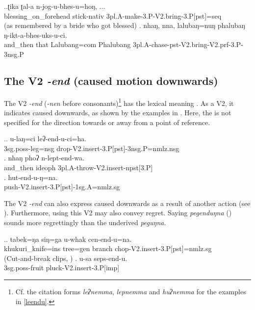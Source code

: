 \ex.\ag.ʈika ʈal-a n-jog-u-bhes-u=hoŋ, ...\\
blessing\_on\_forehead stick{\sc -nativ} {\sc 3pl.A-}make{\sc -3.P-V2.bring-3.P[pst]=seq}\\
 (as remembered by a bride who got blessed) 
\bg. nhaŋ,    nna,  lalubaŋ=nuŋ phalubaŋ ŋ-ikt-a-bhes-uks-u-ci.\\
and\_then that Lalubang{\sc =com}  Phalubang {\sc 3pl.A-}chase{\sc -pst-V2.bring-V2.prf-3.P-3nsg.P}\\
  


\subsection{The V2 \emph{-end}  (caused motion downwards)} \label{V2-insert}%

The V2 \emph{-end} (\ti \emph{-nen} before consonants)\footnote{Cf. the citation forms \emph{leʔnemma}, \emph{lepnemma} and \emph{huʔnemma} for the examples in \ref{leendu}.} has the lexical meaning . As a V2, it indicates caused  downwards, as shown by the examples in \Next. Here, the  is not specified for the direction towards or away from a point of reference.
 
\ex.\label{leendu}\ag. u-laŋ=ci leʔ-end-u-ci=ha.\\
 {\sc 3sg.poss-}leg{\sc =nsg} drop{\sc -V2.insert-3.P[pst]-3nsg.P=nmlz.nsg}\\
\bg. nhaŋ    phoʔ   n-lept-end-wa.\\
	and\_then {\sc ideoph}	{\sc 3pl.A-}throw{\sc -V2.insert-npst[3.P]}\\
	 
	\bg. hut-end-u-ŋ=na.\\
	push{\sc -V2.insert-3.P[pst]-1sg.A=nmlz.sg}\\


The V2 \emph{-end} can also express caused  downwards as a result of another action (see \Next). Furthermore, using this V2 may also convey regret. Saying \emph{pegenduŋna} () sounds more regrettingly than the underived  \emph{peguŋna}.

\ex.\ag. tabek=ŋa siŋ=ga u-whak cen-end-u=na.\\
khukuri\_knife{\sc =ins} tree{\sc =gen} branch chop{\sc -V2.insert-3.P[pst]=nmlz.sg}\\
  (Cut-and-break clips, \citealt{Bohnemeyeretal2010_cut})
\bg. u-sa seps-end-u.\\
{\sc 3sg.poss-}fruit pluck{\sc -V2.insert-3.P[imp]}\\


